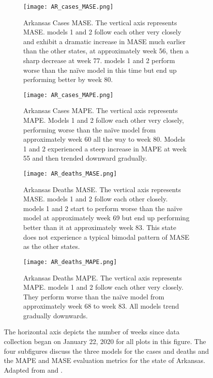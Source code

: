 \begin{figure}
\centering
\begin{subfigure}[t]{0.45\textwidth}
\texttt{[image: AR\_cases\_MASE.png]}
\caption{Arkansas Cases {MASE}. The vertical axis represents MASE. models 1 and 2 follow each other very closely and exhibit a dramatic increase in {MASE} much earlier than the other states, at approximately week 56, then a sharp decrease at week 77. models 1 and 2 perform worse than the na\"ive model in this time but end up performing better by week 80.}
\end{subfigure}\hfill
\begin{subfigure}[t]{0.45\textwidth}
\texttt{[image: AR\_cases\_MAPE.png]}
\caption{Arkansas Cases {MAPE}. The vertical axis represents MAPE. Models 1 and 2 follow each other very closely, performing worse than the na\"ive model from approximately week 60 all the way to week 80. Models 1 and 2 experienced a steep increase in {MAPE} at week 55 and then trended downward gradually.}
\end{subfigure}
\begin{subfigure}[t]{0.45\textwidth}
\texttt{[image: AR\_deaths\_MASE.png]}
\caption{Arkansas Deaths {MASE}. The vertical axis represents MASE. models 1 and 2 follow each other closely. models 1 and 2 start to perform worse than the na\"ive model at approximately week 69 but end up performing better than it at approximately week 83. This state does not experience a typical bimodal pattern of {MASE} as the other states.}
\end{subfigure}\hfill
\begin{subfigure}[t]{0.45\textwidth}
\texttt{[image: AR\_deaths\_MAPE.png]}
\caption{Arkansas Deaths {MAPE}. The vertical axis represents MAPE. models 1 and 2 follow each other very closely. They perform worse than the na\"ive model from approximately week 68 to week 83. All models trend gradually downwards.}
\end{subfigure}
\caption{The horizontal axis depicts the number of weeks since data collection began on January 22, 2020 for all plots in this figure. The four subfigures discuss the three models for the cases and deaths and the MAPE and MASE evaluation metrics for the state of Arkansas. Adapted from \cite{USCB:2019} and \cite{USAFacts:2021a}.
}
\label{fig:AR}
\end{figure}

 


